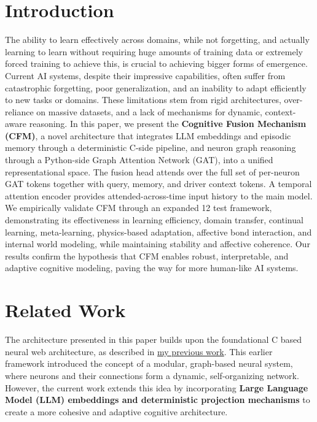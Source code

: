 \documentclass[12pt]{article}
\begin{document}
\section{Introduction}
\label{sec:intro}
The ability to learn effectively across domains, while not forgetting,
and actually learning to learn without requiring huge amounts of
training data or extremely forced training to achieve this, is crucial
to achieving bigger forms of emergence. Current AI systems, despite
their impressive capabilities, often suffer from catastrophic
forgetting, poor generalization, and an inability to adapt efficiently
to new tasks or domains. These limitations stem from rigid
architectures, over-reliance on massive datasets, and a lack of
mechanisms for dynamic, context-aware reasoning. In this paper, we
present the \textbf{Cognitive Fusion Mechanism (CFM)}, a novel
architecture that integrates LLM embeddings and episodic memory through
a deterministic C-side pipeline, and neuron graph reasoning through a
Python-side Graph Attention Network (GAT), into a unified representational
space. The fusion head attends over the full set of per-neuron GAT tokens
together with query, memory, and driver context tokens. A temporal
attention encoder provides attended-across-time input history to the main
model. We empirically validate CFM through an expanded 12 test framework,
demonstrating its effectiveness in learning efficiency, domain transfer,
continual learning, meta-learning, physics-based adaptation, affective
bond interaction, and internal world modeling, while maintaining stability
and affective coherence. Our results confirm the hypothesis that CFM
enables robust, interpretable, and adaptive cognitive modeling, paving
the way for more human-like AI systems.

\section{Related Work}
\label{sec:related}
The architecture presented in this paper builds upon the foundational
C based neural web architecture, as described in
\href{https://github.com/Okerew/larkos/blob/main/Documents/an_idea_of_a_neural_web.pdf}{my
previous work}. This earlier framework introduced the concept of a
modular, graph-based neural system, where neurons and their
connections form a dynamic, self-organizing network. However, the
current work extends this idea by incorporating \textbf{Large Language
Model (LLM) embeddings and deterministic projection mechanisms} to
create a more cohesive and adaptive cognitive architecture.
\end{document}
